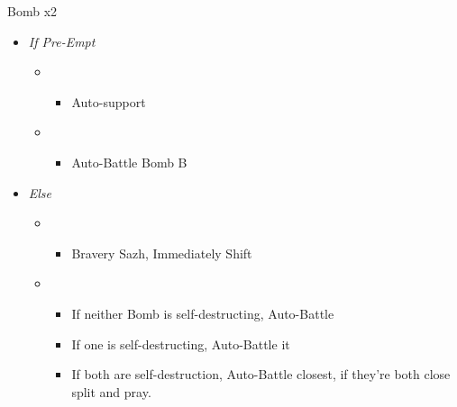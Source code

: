 \begin{multicols}{2}
	\begin{battle}[0:11]{Bomb x2}
		\begin{itemize}
			\item \textit{If Pre-Empt}
			      \begin{itemize}
				      \item \second
				            \begin{itemize}
					            \item Auto-support
				            \end{itemize}
				      \item \first
				            \begin{itemize}
					            \item Auto-Battle Bomb B
				            \end{itemize}
			      \end{itemize}
			\item \textit{Else}
			      \begin{itemize}
				      \item \second
				            \begin{itemize}
					            \item Bravery Sazh, Immediately Shift
				            \end{itemize}
				      \item \first
				            \begin{itemize}
					            \item If neither Bomb is self-destructing, Auto-Battle
					            \item If one is self-destructing, Auto-Battle it
					            \item If both are self-destruction, Auto-Battle closest, if they're both close split and pray.
				            \end{itemize}
			      \end{itemize}
		\end{itemize}
	\end{battle}


\end{multicols}
